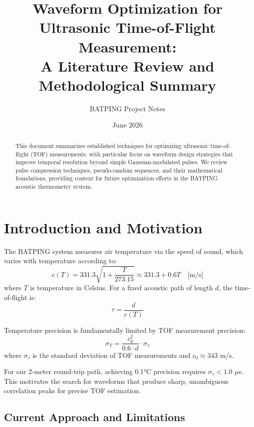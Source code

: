 \documentclass[11pt]{article}
\title{Waveform Optimization for Ultrasonic Time-of-Flight Measurement: \\
A Literature Review and Methodological Summary}
\author{BATPING Project Notes}
\date{June 2026}
\begin{document}
\maketitle

\begin{abstract}
This document summarizes established techniques for optimizing ultrasonic time-of-flight (TOF) measurements, with particular focus on waveform design strategies that improve temporal resolution beyond simple Gaussian-modulated pulses. We review pulse compression techniques, pseudo-random sequences, and their mathematical foundations, providing context for future optimization efforts in the BATPING acoustic thermometry system.
\end{abstract}

\tableofcontents
\newpage

\section{Introduction and Motivation}

The BATPING system measures air temperature via the speed of sound, which varies with temperature according to:
\begin{equation}
c(T) = 331.3\sqrt{1 + \frac{T}{273.15}} \approx 331.3 + 0.6T \quad \text{[m/s]}
\end{equation}
where $T$ is temperature in Celsius. For a fixed acoustic path of length $d$, the time-of-flight is:
\begin{equation}
\tau = \frac{d}{c(T)}
\end{equation}

Temperature precision is fundamentally limited by TOF measurement precision:
\begin{equation}
\sigma_T = \frac{c_0^2}{0.6 \cdot d} \cdot \sigma_\tau
\end{equation}
where $\sigma_\tau$ is the standard deviation of TOF measurements and $c_0 \approx 343$ m/s.

For our 2-meter round-trip path, achieving 0.1°C precision requires $\sigma_\tau < 1.0$ $\mu$s. This motivates the search for waveforms that produce sharp, unambiguous correlation peaks for precise TOF estimation.

\subsection{Current Approach and Limitations}
\end{document}
